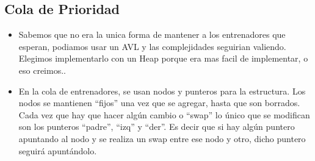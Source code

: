 \subsection{Cola de Prioridad}

\begin{itemize}

\item{Sabemos que no era la unica forma de mantener a los entrenadores que esperan, podiamos usar un AVL y las complejidades seguirian valiendo. Elegimos implementarlo con un Heap porque era mas facil de implementar, o eso creimos..}

\item{En la cola de entrenadores, se usan nodos y punteros para la estructura. Los nodos se mantienen ``fijos'' una vez que se agregar, hasta que son borrados. Cada vez que hay que hacer alg\'un cambio o ``swap'' lo \'unico que se modifican son los punteros ``padre'', ``izq'' y ``der''. Es decir que si hay alg\'un puntero apuntando al nodo y se realiza un swap entre ese nodo y otro, dicho puntero seguir\'a apunt\'andolo.}

\end{itemize}


